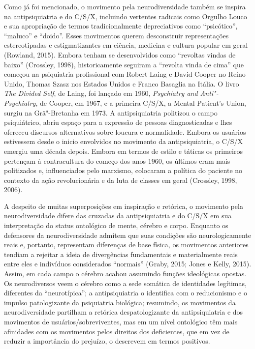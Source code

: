 Como já foi mencionado, o movimento pela neurodiversidade também se
inspira na antipsiquiatria e do C/S/X, incluindo vertentes radicais como
Orgulho Louco e sua apropriação de termos tradicionalmente depreciativos
como ``psicótico'', ``maluco'' e ``doido''. Esses movimentos querem
desconstruir representações estereotipadas e estigmatizantes em ciência,
medicina e cultura popular em geral (Rowland, 2015). Embora tenham se
desenvolvidos como ``revoltas vindas de baixo'' (Crossley, 1998),
historicamente seguiram a ``revolta vinda de cima'' que começou na
psiquiatria profissional com Robert Laing e David Cooper no Reino Unido,
Thomas Szasz nos Estados Unidos e Franco Basaglia na Itália. O livro
\emph{The Divided Self}, de Laing, foi lançado em 1960, \emph{Psychiatry
and Anti"-Psychiatry}, de Cooper, em 1967, e a primeira C/S/X, a Mental
Patient's Union, surgiu na Grã"-Bretanha em 1973. A antipsiquiatria
politizou o campo psiquiátrico, abriu espaço para a expressão de pessoas
diagnosticadas e lhes ofereceu discursos alternativos sobre loucura e
normalidade. Embora os usuários estivessem desde o inicio envolvidos no
movimento da antipsiquiatria, o C/S/X emergiu uma década depois. Embora
em termos de estilo e táticas os primeiros pertençam à contracultura do
começo dos anos 1960, os últimos eram mais politizados e, influenciados
pelo marxismo, colocaram a política do paciente no contexto da ação
revolucionária e da luta de classes em geral (Crossley, 1998, 2006).

A despeito de muitas superposições em inspiração e retórica, o movimento
pela neurodiversidade difere das cruzadas da antipsiquiatria e do C/S/X
em sua interpretação do status ontológico de mente, cérebro e corpo.
Enquanto os defensores da neurodiversidade admitem que suas condições
são neurologicamente reais e, portanto, representam diferenças de base
física, os movimentos anteriores tendiam a rejeitar a ideia de
divergências fundamentais e materialmente reais entre eles e indivíduos
considerados ``normais'' (Graby, 2015; Jones e Kelly, 2015). Assim, em
cada campo o cérebro acabou assumindo funções ideológicas opostas. Os
neurodiversos veem o cérebro como a sede somática de identidades
legítimas, diferentes da ``neurotípica''; a antipsiquiatria o identifica
com o reducionismo e o impulso patologizante da psiquiatria biológica;
resumindo, os movimentos da neurodiversidade partilham a retórica
despatologizante da antipsiquiatria e dos movimentos de
usuários/sobreviventes, mas em um nível ontológico têm mais afinidades
com os movimentos pelos direitos dos deficientes, que em vez de reduzir
a importância do prejuízo, o descrevem em termos positivos.

